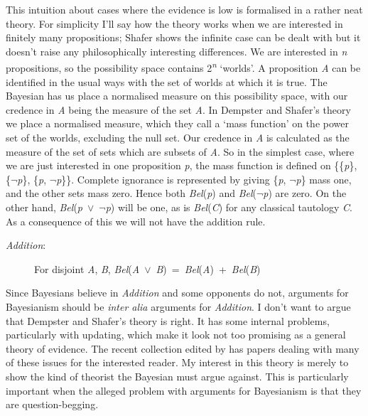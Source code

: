 This intuition about cases where the evidence is low is formalised in a rather neat theory. For simplicity I'll say how the theory works when we are interested in finitely many propositions; Shafer shows the infinite case can be dealt with but it doesn't raise any philosophically interesting differences. We are interested in \textit{n} propositions, so the possibility space contains 2\textit{\textsuperscript{n}} `worlds'. A proposition \textit{A} can be identified in the usual ways with the set of worlds at which it is true. The Bayesian has us place a normalised measure on this possibility space, with our credence in \textit{A} being the measure of the set \textit{A}. In Dempster and Shafer's theory we place a normalised measure, which they call a `mass function' on the power set of the worlds, excluding the null set. Our credence in \textit{A} is calculated as the measure of the set of sets which are subsets of \textit{A}. So in the simplest case, where we are just interested in one proposition \textit{p}, the mass function is defined on \{\{\textit{p}\}, \{${\lnot}$\textit{p}\}, \{\textit{p}, ${\lnot}$\textit{p}\}\}. Complete ignorance is represented by giving \{\textit{p}, ${\lnot}$\textit{p}\} mass one, and the other sets mass zero. Hence both \textit{Bel}(\textit{p}) and \textit{Bel}(${\lnot}$\textit{p}) are zero. On the other hand, \textit{Bel}(\textit{p}~${\vee}$~${\lnot}$\textit{p}) will be one, as is \textit{Bel}(\textit{C}) for any classical tautology \textit{C}. As a consequence of this we will not have the addition rule.

\begin{description}
\item[\textit{Addition}:] For disjoint \textit{A}, \textit{B}, \textit{Bel}(\textit{A}~${\vee}$~\textit{B})~=~\textit{Bel}(\textit{A})~+~\textit{Bel}(\textit{B})
\end{description}

\noindent Since Bayesians believe in \textit{Addition} and some opponents do not, arguments for Bayesianism should be \textit{inter alia} arguments for \textit{Addition}. I don't want to argue that Dempster and Shafer's theory is right. It has some internal problems, particularly with updating, which make it look not too promising as a general theory of evidence. The recent collection edited by \citet{Yager1994} has papers dealing with many of these issues for the interested reader. My interest in this theory is merely to show the kind of theorist the Bayesian must argue against. This is particularly important when the alleged problem with arguments for Bayesianism is that they are question-begging.

